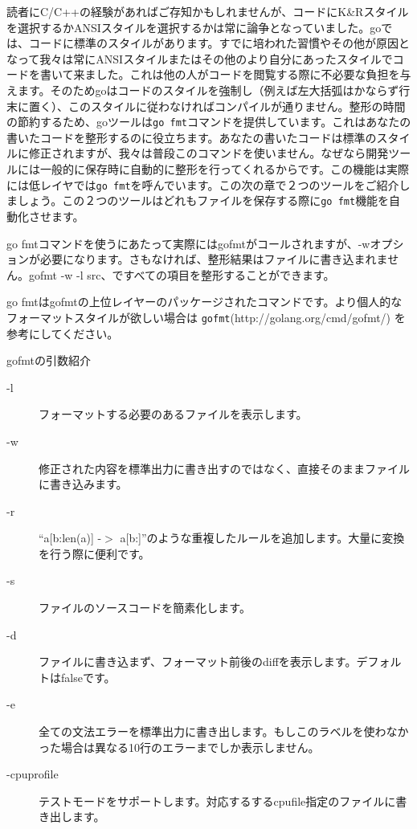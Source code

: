  読者にC\//C++の経験があればご存知かもしれませんが、コードにK\&Rスタイルを選択するかANSIスタイルを選択するかは常に論争となっていました。goでは、コードに標準のスタイルがあります。すでに培われた習慣やその他が原因となって我々は常にANSIスタイルまたはその他のより自分にあったスタイルでコードを書いて来ました。これは他の人がコードを閲覧する際に不必要な負担を与えます。そのためgoはコードのスタイルを強制し（例えば左大括弧はかならず行末に置く）、このスタイルに従わなければコンパイルが通りません。整形の時間の節約するため、goツールは\texttt{go fmt}コマンドを提供しています。これはあなたの書いたコードを整形するのに役立ちます。あなたの書いたコードは標準のスタイルに修正されますが、我々は普段このコマンドを使いません。なぜなら開発ツールには一般的に保存時に自動的に整形を行ってくれるからです。この機能は実際には低レイヤでは\texttt{go fmt}を呼んでいます。この次の章で２つのツールをご紹介しましょう。この２つのツールはどれもファイルを保存する際に\texttt{go fmt}機能を自動化させます。

go fmtコマンドを使うにあたって実際にはgofmtがコールされますが、-wオプションが必要になります。さもなければ、整形結果はファイルに書き込まれません。gofmt -w -l src、ですべての項目を整形することができます。

go fmtはgofmtの上位レイヤーのパッケージされたコマンドです。より個人的なフォーマットスタイルが欲しい場合は \texttt{gofmt}(http:\//\//golang.org\//cmd\//gofmt\//) を参考にしてください。

gofmtの引数紹介

\begin{description}
  \item[-l] フォーマットする必要のあるファイルを表示します。
  \item[-w] 修正された内容を標準出力に書き出すのではなく、直接そのままファイルに書き込みます。
  \item[-r] “a[b:len(a)] -$>$ a[b:]”のような重複したルールを追加します。大量に変換を行う際に便利です。
  \item[-s] ファイルのソースコードを簡素化します。
  \item[-d] ファイルに書き込まず、フォーマット前後のdiffを表示します。デフォルトはfalseです。
  \item[-e] 全ての文法エラーを標準出力に書き出します。もしこのラベルを使わなかった場合は異なる10行のエラーまでしか表示しません。
  \item[-cpuprofile] テストモードをサポートします。対応するするcpufile指定のファイルに書き出します。
\end{description}

